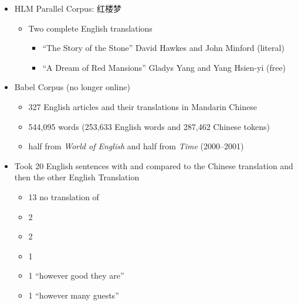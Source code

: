 \documentclass[a4paper,landscape,headrule,footrule,dvips]{foils}
\begin{document}
\begin{CJK}{UTF8}{min}
\MyLogo{}
\newcommand{\ZH}[1]{#1}
\begin{itemize}
\item HLM Parallel Corpus: \ZH{红楼梦} 
  \begin{itemize}
  \item Two complete English translations
    \begin{itemize}
    \item ``The Story of the Stone'' David Hawkes and John Minford \hfill (literal)
    \item ``A Dream of Red Mansions'' Gladys Yang and Yang Hsien-yi \hfill (free)
    \end{itemize}
  \end{itemize}
\item Babel Corpus (no longer online)
  \begin{itemize}
  \item 327 English articles and their translations in Mandarin Chinese
  \item 544,095 words (253,633 English words and 287,462 Chinese tokens)
  \item half  from \textit{World of English} and half from \textit{Time} (2000--2001)
  \end{itemize}
\end{itemize}


\begin{itemize}
\item Took 20 English sentences with  and compared to the Chinese translation and then the other English Translation
  \begin{itemize}
  \item 13 no translation of 
  \item 2  
  \item 2  
  \item 1  
  \item 1  ``however good they are''
  \item 1  ``however many guests''
  \end{itemize}
\end{itemize}



\end{CJK}
\end{document}
